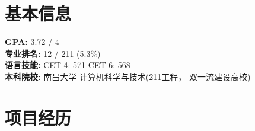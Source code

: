 \documentclass{resume}
\begin{document}









\section{基本信息}
\textbf{GPA: } 3.72 / 4 \\
\textbf{专业排名: } 12 / 211 (5.3\%)  \\
\textbf{语言技能: } CET-4: 571 \quad CET-6: 568 \\
\textbf{本科院校: } 南昌大学-计算机科学与技术(211工程， 双一流建设高校) 



\section{项目经历}
\end{document}
